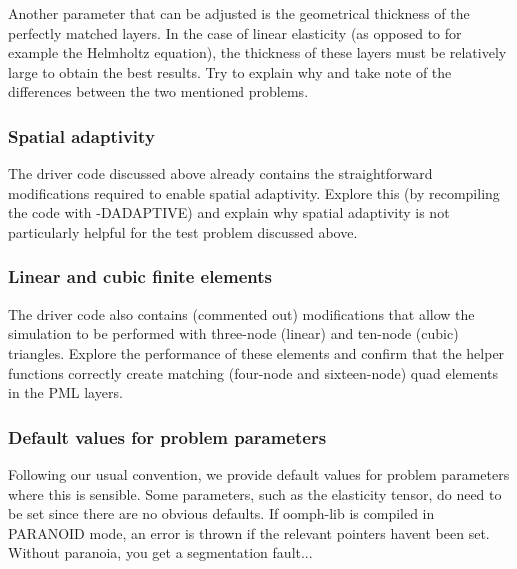 Another parameter that can be adjusted is the geometrical thickness of the perfectly matched layers. In the case of linear elasticity (as opposed to for example the Helmholtz equation), the thickness of these layers must be relatively large to obtain the best results. Try to explain why and take note of the differences between the two mentioned problems.\hypertarget{index_adaptivity}{}\subsubsection{Spatial adaptivity}\label{index_adaptivity}
The driver code discussed above already contains the straightforward modifications required to enable spatial adaptivity. Explore this (by recompiling the code with -\/\+D\+A\+D\+A\+P\+T\+I\+VE) and explain why spatial adaptivity is not particularly helpful for the test problem discussed above.\hypertarget{index_diff_order}{}\subsubsection{Linear and cubic finite elements}\label{index_diff_order}
The driver code also contains (commented out) modifications that allow the simulation to be performed with three-\/node (linear) and ten-\/node (cubic) triangles. Explore the performance of these elements and confirm that the helper functions correctly create matching (four-\/node and sixteen-\/node) quad elements in the P\+ML layers.\hypertarget{index_default}{}\subsubsection{Default values for problem parameters}\label{index_default}
Following our usual convention, we provide default values for problem parameters where this is sensible. Some parameters, such as the elasticity tensor, do need to be set since there are no obvious defaults. If {\ttfamily oomph-\/lib} is compiled in {\ttfamily P\+A\+R\+A\+N\+O\+ID} mode, an error is thrown if the relevant pointers haven\textquotesingle{}t been set. Without paranoia, you get a segmentation fault...

